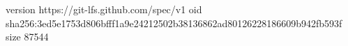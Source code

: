 version https://git-lfs.github.com/spec/v1
oid sha256:3ed5e1753d806bfff1a9e24212502b38136862ad80126228186609b942fb593f
size 87544
